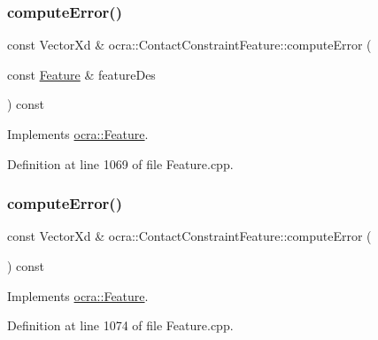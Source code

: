 \subsubsection{\texorpdfstring{compute\+Error()}{computeError()}\hspace{0.1cm}{\footnotesize\ttfamily [1/2]}}
{\footnotesize\ttfamily const Vector\+Xd \& ocra\+::\+Contact\+Constraint\+Feature\+::compute\+Error (\begin{DoxyParamCaption}\item[{const \hyperlink{classocra_1_1Feature}{Feature} \&}]{feature\+Des }\end{DoxyParamCaption}) const\hspace{0.3cm}{\ttfamily [virtual]}}



Implements \hyperlink{classocra_1_1Feature_aaa74d6869f7e574fcc39d443581ddf77}{ocra\+::\+Feature}.



Definition at line 1069 of file Feature.\+cpp.

\hypertarget{classocra_1_1ContactConstraintFeature_ae846fba34c59502db6cf0a0dac0e6be3}{}\label{classocra_1_1ContactConstraintFeature_ae846fba34c59502db6cf0a0dac0e6be3} 
\subsubsection{\texorpdfstring{compute\+Error()}{computeError()}\hspace{0.1cm}{\footnotesize\ttfamily [2/2]}}
{\footnotesize\ttfamily const Vector\+Xd \& ocra\+::\+Contact\+Constraint\+Feature\+::compute\+Error (\begin{DoxyParamCaption}{ }\end{DoxyParamCaption}) const\hspace{0.3cm}{\ttfamily [virtual]}}



Implements \hyperlink{classocra_1_1Feature_a88f87b496aedc7bf9f13b19bb8f9c7fa}{ocra\+::\+Feature}.



Definition at line 1074 of file Feature.\+cpp.

\hypertarget{classocra_1_1ContactConstraintFeature_a0be2debba15230d160957c15eb5afa97}{}\label{classocra_1_1ContactConstraintFeature_a0be2debba15230d160957c15eb5afa97} 
